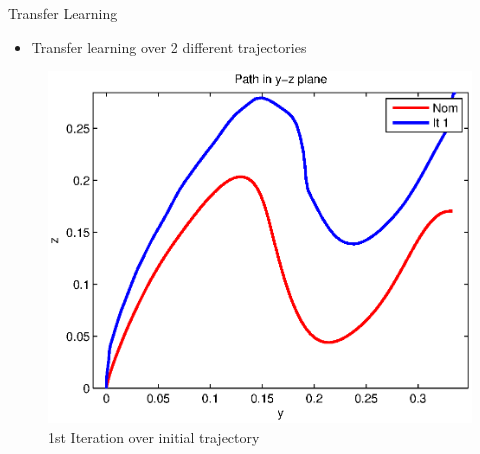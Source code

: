 \documentclass[handout]{beamer}
\begin{document}
\begin{frame}{Transfer Learning}
\begin{itemize}
\item Transfer learning over 2 different trajectories
\end{itemize}
\begin{figure}
\center
\includegraphics[scale=0.40]{transfer_learning0.eps}			
\caption{1st Iteration over initial trajectory}
\end{figure}
\end{frame}
%
\end{document}
